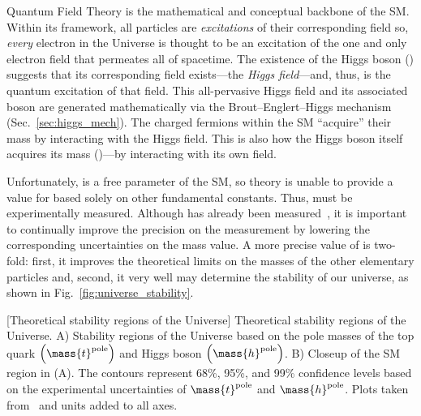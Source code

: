 Quantum Field Theory is the mathematical and conceptual backbone of the SM.
Within its framework, all particles are \emph{excitations} of their corresponding field so, \eg \emph{every} electron in the Universe is thought to be an excitation of the one and only electron field that permeates all of spacetime.
The existence of the Higgs boson (\PH) suggests that its corresponding field exists---the \emph{Higgs field}---and, thus, \PH is the quantum excitation of that field.
This all-pervasive Higgs field and its associated boson are generated mathematically via the Brout--Englert--Higgs mechanism (Sec.~\ref{sec:higgs_mech}).
The charged fermions within the SM ``acquire'' their mass by interacting with the Higgs field.
This is also how the Higgs boson itself acquires its mass (\mH)---by interacting with its own field.

Unfortunately, \mH is a free parameter of the SM, so theory is unable to provide a value for \mH based solely on other fundamental constants. %
Thus, \mH must be experimentally measured.
Although \mH has already been measured~\cite{chatrchyan_observation_2012, aad_observation_2012, chatrchyan_observation_2013, PhysRevLett.114.191803, the_cms_collaboration_precise_2015, HIG_16_041, aaboud_measurement_2018, CMS-PAS-HIG-18-029, ATLAS-CONF-2019-025, sirunyan_measurement_2020}, it is important to continually improve the precision on the measurement by lowering the corresponding uncertainties on the mass value.
A more precise value of \mH is two-fold: %
first, it improves the theoretical limits on the masses of the other elementary particles and, second, it very well may determine the stability of our universe, as shown in Fig.~\ref{fig:universe_stability}.
\begin{multiFigure}
    \centering
        [Theoretical stability regions of the Universe]
        {Theoretical stability regions of the Universe.
        A) Stability regions of the Universe based on the pole masses of the top quark $\left( \mass{t}^\text{pole} \right)$ and Higgs boson $\left( \mass{h}^\text{pole} \right)$.
        B) Closeup of the SM region in (A).
        The contours represent 68\%, 95\%, and 99\% confidence levels based on the experimental uncertainties of $\mass{t}^\text{pole}$ and $\mass{h}^\text{pole}$.
        Plots taken from~\cite{univ_stab} and units added to all axes.
        }
    \label{fig:universe_stability}
\end{multiFigure}

